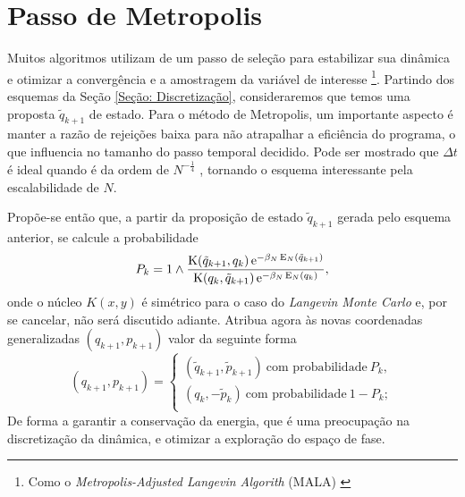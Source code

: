 \section{Passo de Metropolis}
\label{Section: Metropolis}

Muitos algoritmos utilizam de um passo de seleção para estabilizar sua dinâmica e otimizar a convergência e a amostragem da variável de interesse \footnote{Como o \textit{Metropolis-Adjusted Langevin Algorith} (MALA) \cite[Anexo~C]{leimmolecular}}. Partindo dos esquemas da Seção \ref{Seção: Discretização}, consideraremos que temos uma proposta $\tilde{q}_{k+1}$ de estado. Para o método de Metropolis, um importante aspecto é manter a razão de rejeições baixa para não atrapalhar a eficiência do programa, o que influencia no tamanho do passo temporal decidido. Pode ser mostrado que $\Delta t$ é ideal quando é da ordem de $N^{-\frac{1}{4}}$ \cite{Chafa2018}, tornando o esquema interessante pela escalabilidade de $N$.

Propõe-se então que, a partir da proposição de estado $\tilde{q}_{k+1}$ gerada pelo esquema anterior, se calcule a probabilidade
\begin{equation}
P_k = 1 \wedge \frac{\operatorname{K}(\tilde{q}_{k+1}, q_k) \operatorname{\textrm e}^{-\beta_N \operatorname{E}_N(\tilde{q}_{k+1})}}{\operatorname{K}(q_k, \tilde{q}_{k+1}) \operatorname{\textrm e}^{-\beta_N \operatorname{E}_N(q_{k})}},
\label{Equation: Pk}
\end{equation}
onde o núcleo $K(x, y)$ é simétrico \cite{Chafa2018} para o caso do \textit{Langevin Monte Carlo} e, por se cancelar, não será discutido adiante. Atribua agora às novas coordenadas generalizadas $(q_{k+1}, p_{k+1})$ valor da seguinte forma
\begin{equation}
	(q_{k+1}, p_{k+1}) =
\begin{cases}
	(\tilde{q}_{k+1}, \tilde{p}_{k+1}) \ \text{com probabilidade} \ P_k, \\
	(q_k, -\tilde{p}_{k}) \ \text{com probabilidade} \ 1-P_k; \\
\end{cases}
\label{Equation: Metropolis}
\end{equation}
De forma a garantir a conservação da energia, que é uma preocupação na discretização da dinâmica, e otimizar a exploração do espaço de fase.